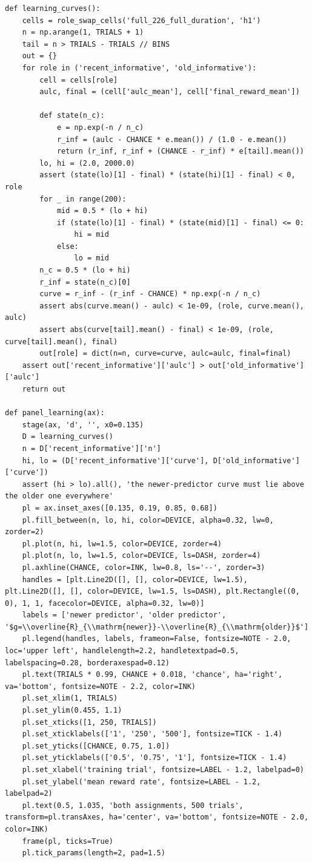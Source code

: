 \documentclass[a4paper,10pt]{article}
\begin{document}
\begin{Verbatim}
def learning_curves():
    cells = role_swap_cells('full_226_full_duration', 'h1')
    n = np.arange(1, TRIALS + 1)
    tail = n > TRIALS - TRIALS // BINS
    out = {}
    for role in ('recent_informative', 'old_informative'):
        cell = cells[role]
        aulc, final = (cell['aulc_mean'], cell['final_reward_mean'])

        def state(n_c):
            e = np.exp(-n / n_c)
            r_inf = (aulc - CHANCE * e.mean()) / (1.0 - e.mean())
            return (r_inf, r_inf + (CHANCE - r_inf) * e[tail].mean())
        lo, hi = (2.0, 2000.0)
        assert (state(lo)[1] - final) * (state(hi)[1] - final) < 0, role
        for _ in range(200):
            mid = 0.5 * (lo + hi)
            if (state(lo)[1] - final) * (state(mid)[1] - final) <= 0:
                hi = mid
            else:
                lo = mid
        n_c = 0.5 * (lo + hi)
        r_inf = state(n_c)[0]
        curve = r_inf - (r_inf - CHANCE) * np.exp(-n / n_c)
        assert abs(curve.mean() - aulc) < 1e-09, (role, curve.mean(), aulc)
        assert abs(curve[tail].mean() - final) < 1e-09, (role, curve[tail].mean(), final)
        out[role] = dict(n=n, curve=curve, aulc=aulc, final=final)
    assert out['recent_informative']['aulc'] > out['old_informative']['aulc']
    return out

def panel_learning(ax):
    stage(ax, 'd', '', x0=0.135)
    D = learning_curves()
    n = D['recent_informative']['n']
    hi, lo = (D['recent_informative']['curve'], D['old_informative']['curve'])
    assert (hi > lo).all(), 'the newer-predictor curve must lie above the older one everywhere'
    pl = ax.inset_axes([0.135, 0.19, 0.85, 0.68])
    pl.fill_between(n, lo, hi, color=DEVICE, alpha=0.32, lw=0, zorder=2)
    pl.plot(n, hi, lw=1.5, color=DEVICE, zorder=4)
    pl.plot(n, lo, lw=1.5, color=DEVICE, ls=DASH, zorder=4)
    pl.axhline(CHANCE, color=INK, lw=0.8, ls='--', zorder=3)
    handles = [plt.Line2D([], [], color=DEVICE, lw=1.5), plt.Line2D([], [], color=DEVICE, lw=1.5, ls=DASH), plt.Rectangle((0, 0), 1, 1, facecolor=DEVICE, alpha=0.32, lw=0)]
    labels = ['newer predictor', 'older predictor', '$g=\\overline{R}_{\\mathrm{newer}}-\\overline{R}_{\\mathrm{older}}$']
    pl.legend(handles, labels, frameon=False, fontsize=NOTE - 2.0, loc='upper left', handlelength=2.2, handletextpad=0.5, labelspacing=0.28, borderaxespad=0.12)
    pl.text(TRIALS * 0.99, CHANCE + 0.018, 'chance', ha='right', va='bottom', fontsize=NOTE - 2.2, color=INK)
    pl.set_xlim(1, TRIALS)
    pl.set_ylim(0.455, 1.1)
    pl.set_xticks([1, 250, TRIALS])
    pl.set_xticklabels(['1', '250', '500'], fontsize=TICK - 1.4)
    pl.set_yticks([CHANCE, 0.75, 1.0])
    pl.set_yticklabels(['0.5', '0.75', '1'], fontsize=TICK - 1.4)
    pl.set_xlabel('training trial', fontsize=LABEL - 1.2, labelpad=0)
    pl.set_ylabel('mean reward rate', fontsize=LABEL - 1.2, labelpad=2)
    pl.text(0.5, 1.035, 'both assignments, 500 trials', transform=pl.transAxes, ha='center', va='bottom', fontsize=NOTE - 2.0, color=INK)
    frame(pl, ticks=True)
    pl.tick_params(length=2, pad=1.5)


\end{Verbatim}
\end{document}
